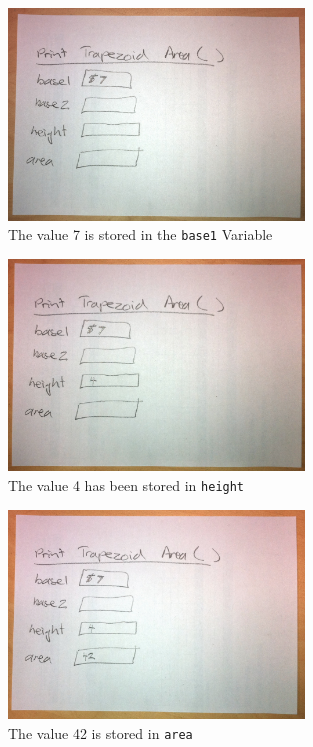 \begin{figure}[htbp]
   \centering
   \includegraphics[width=0.7\textwidth]{./topics/storing-using-data/images/hand-exe-3} 
   \caption{The value 7 is stored in the \texttt{base1} Variable}
   \label{fig:hand-exe-3}
\end{figure}

\begin{figure}[htbp]
   \centering
   \includegraphics[width=0.7\textwidth]{./topics/storing-using-data/images/hand-exe-4} 
   \caption{The value 4 has been stored in \texttt{height}}
   \label{fig:hand-exe-4}
\end{figure}

\begin{figure}[htbp]
   \centering
   \includegraphics[width=0.7\textwidth]{./topics/storing-using-data/images/hand-exe-5} 
   \caption{The value 42 is stored in \texttt{area}}
   \label{fig:hand-exe-5}
\end{figure}


